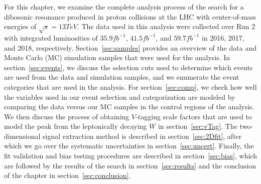 For this chapter, we examine the complete analysis process of the search for a dibosonic resonance produced in proton collisions at the LHC with center-of-mass energies of $\sqrt{s}=13\unit{TeV}$.
The data used in this analysis were collected over Run 2 with integrated luminosities of $35.9\unit{fb^{-1}}$, $41.5\unit{fb^{-1}}$, and $59.7\unit{fb^{-1}}$ in 2016, 2017, and 2018, respectively.
Section~\ref{sec:samples} provides an overview of the data and Monte Carlo (MC) simulation samples that were used for the analysis.
In section~\ref{sec:events}, we discuss the selection cuts used to determine which events are used from the data and simulation samples, and we enumerate the event categories that are used in the analysis.
For section~\ref{sec:comp}, we check how well the variables used in our event selection and categorization are modeled by comparing the data versus our MC samples in the control regions of the analysis.
We then discuss the process of obtaining $V$-tagging scale factors that are used to model the peak from the leptonically decaying $W$ in section~\ref{sec:vTag}.
The two-dimensional signal extraction method is described in section~\ref{sec:2Dfit}, after which we go over the systematic uncertainties in section~\ref{sec:uncert}.
Finally, the fit validation and bias testing procedures are described in section~\ref{sec:bias}, which are followed by the results of the search in section~\ref{sec:results} and the conclusion of the chapter in section~\ref{sec:conclusion}.
